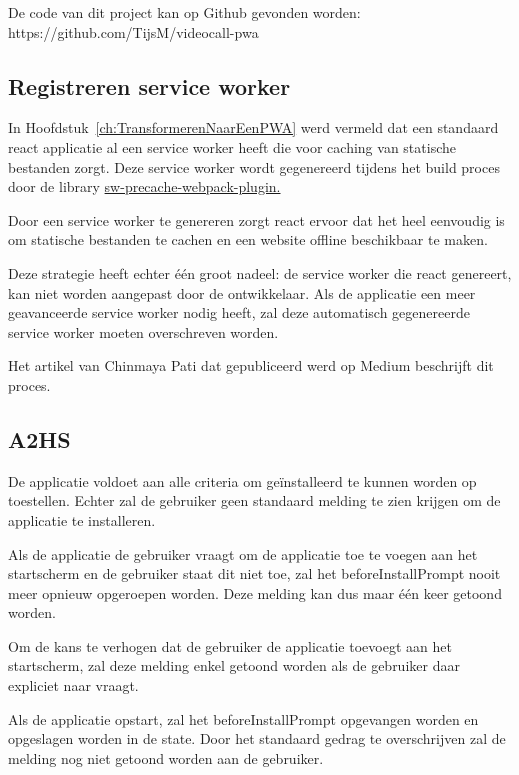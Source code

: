 	De code van dit project kan op Github gevonden worden: https://github.com/TijsM/videocall-pwa
	
	\subsection{Registreren service worker}
		
		In Hoofdstuk~\ref{ch:TransformerenNaarEenPWA} werd vermeld dat een standaard react applicatie al een service worker heeft die voor caching van statische bestanden zorgt. Deze service worker wordt gegenereerd tijdens het build proces door de library \href{https://github.com/goldhand/sw-precache-webpack-plugin}{sw-precache-webpack-plugin. }  
		\autocite{Mester2019}
		
		Door een service worker te genereren zorgt react ervoor dat het heel eenvoudig is om statische bestanden te cachen en een website offline beschikbaar te maken.
		
		Deze strategie heeft echter één groot nadeel: de service worker die react genereert, kan niet worden aangepast door de ontwikkelaar. Als de applicatie een meer geavanceerde service worker nodig heeft, zal deze automatisch gegenereerde service worker moeten overschreven worden.
		
		Het artikel van Chinmaya Pati dat gepubliceerd werd op Medium beschrijft dit proces. \autocite{Pati2019}
		
	\subsection{A2HS}
	
		De applicatie voldoet aan alle criteria om geïnstalleerd te kunnen worden op toestellen. Echter zal de gebruiker geen standaard melding te zien krijgen om de applicatie te installeren.		
		
		Als de applicatie de gebruiker vraagt om de applicatie toe te voegen aan het startscherm en de gebruiker staat dit niet toe, zal het beforeInstallPrompt nooit meer opnieuw opgeroepen worden. Deze melding kan dus maar één keer getoond worden.
		
		Om de kans te verhogen dat de gebruiker de applicatie toevoegt aan het startscherm, zal deze melding enkel getoond worden als de gebruiker daar expliciet naar vraagt.
		\autocite{Mclachlan2020}
		
		Als de applicatie opstart, zal het beforeInstallPrompt opgevangen worden en opgeslagen worden in de state. Door het standaard gedrag te overschrijven zal de melding nog niet getoond worden aan de gebruiker.
		\autocite{LePage2020b}
	
